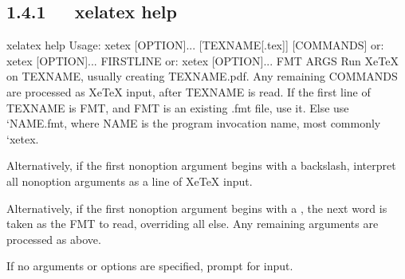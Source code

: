 \documentclass[letterpaper,12pt,english]{sphinxmanual}
\begin{document}
\subsection{1.4.1   xelatex \textendash{}help}
\label{\detokenize{001software/001install/LaTex:xelatex-help}}
\begin{sphinxVerbatim}[commandchars=\\\{\}]
xelatex \PYGZhy{}\PYGZhy{}help
Usage: xetex [OPTION]... [TEXNAME[.tex]] [COMMANDS]
   or: xetex [OPTION]... \PYGZbs{}FIRST\PYGZhy{}LINE
   or: xetex [OPTION]... \PYGZam{}FMT ARGS
  Run XeTeX on TEXNAME, usually creating TEXNAME.pdf.
  Any remaining COMMANDS are processed as XeTeX input, after TEXNAME is read.
  If the first line of TEXNAME is \PYGZpc{}\PYGZam{}FMT, and FMT is an existing .fmt file,
  use it.  Else use {}`NAME.fmt\PYGZsq{}, where NAME is the program invocation name,
  most commonly {}`xetex\PYGZsq{}.

  Alternatively, if the first non\PYGZhy{}option argument begins with a backslash,
  interpret all non\PYGZhy{}option arguments as a line of XeTeX input.

  Alternatively, if the first non\PYGZhy{}option argument begins with a \PYGZam{}, the
  next word is taken as the FMT to read, overriding all else.  Any
  remaining arguments are processed as above.

  If no arguments or options are specified, prompt for input.


\end{sphinxVerbatim}
\end{document}

